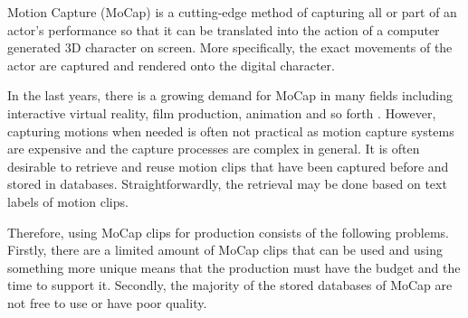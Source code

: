 Motion Capture (MoCap) is a cutting-edge method of capturing all or part of an actor's performance so that it can be translated into the action of a computer generated 3D character on screen. More specifically, the exact movements of the actor are captured and rendered onto the digital character. 

In the last years, there is a growing demand for MoCap in many fields including interactive virtual reality, film production, animation and so forth \cite{Efficient Content-Based Retrieval of Motion Capture Data}. However, capturing motions when needed is often not practical as motion capture systems are expensive and the capture processes are complex in general. It is often desirable to retrieve and reuse motion clips that have been captured before and stored in databases. Straightforwardly, the retrieval may be done based on text labels of motion clips. 

Therefore, using MoCap clips for production consists of the following problems. Firstly, there are a limited amount of MoCap clips that can be used and using something more unique means that the production must have the budget and the time to support it. Secondly, the majority of the stored databases of MoCap are not free to use or have poor quality.
